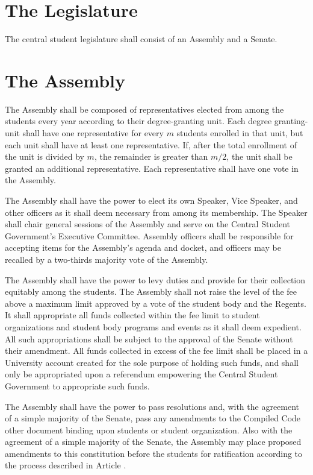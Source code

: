 \section{The Legislature}
    The central student legislature shall consist of an Assembly and a Senate.

\section{The Assembly}
    The Assembly shall be composed of representatives elected from among the students every year according to their degree-granting unit. Each degree granting-unit shall have one representative for every $m$ students enrolled in that unit, but each unit shall have at least one representative. If, after the total enrollment of the unit is divided by $m$, the remainder is greater than $m/2$, the unit shall be granted an additional representative. Each representative shall have one vote in the Assembly. 

    The Assembly shall have the power to elect its own Speaker, Vice Speaker, and other officers as it shall deem necessary from among its membership. The Speaker shall chair general sessions of the Assembly and serve on the Central Student Government's Executive Committee. Assembly officers shall be responsible for accepting items for the Assembly's agenda and docket, and officers may be recalled by a two-thirds majority vote of the Assembly.

     The Assembly shall have the power to levy duties and provide for their collection equitably among the students. The Assembly shall not raise the level of the fee above a maximum limit approved by a vote of the student body and the Regents. It shall appropriate all funds collected within the fee limit to student organizations and student body programs and events as it shall deem expedient. All such appropriations shall be subject to the approval of the Senate without their amendment. All funds collected in excess of the fee limit shall be placed in a University account created for the sole purpose of holding such funds, and shall only be appropriated upon a referendum empowering the Central Student Government to appropriate such funds.

    The Assembly shall have the power to pass resolutions and, with the agreement of a simple majority of the Senate, pass any amendments to the Compiled Code other document binding upon students or student organization. Also with the agreement of a simple majority of the Senate, the Assembly may place proposed amendments to this constitution before the students for ratification according to the process described in Article . 

